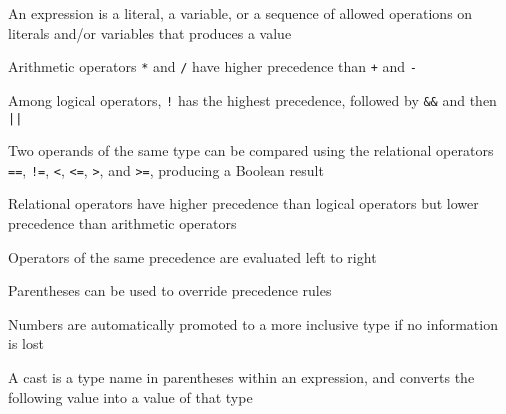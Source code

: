 \documentclass[8pt,a4paper,compress]{beamer}
\begin{document}
\begin{frame}[fragile]
An expression is a literal, a variable, or a sequence of allowed operations on literals and/or variables that produces a value

\bigskip

Arithmetic operators \lstinline{*} and \lstinline{/} have higher precedence than \lstinline{+} and \lstinline{-}

\bigskip

Among logical operators, \lstinline{!} has the highest precedence, followed by \lstinline{&&} and then \lstinline{||}

\bigskip

Two operands of the same type can be compared using the relational operators \lstinline{==}, \lstinline{!=}, \lstinline{<}, \lstinline{<=}, \lstinline{>}, and \lstinline{>=}, producing a Boolean result

\bigskip

Relational operators have higher precedence than logical operators but lower precedence than arithmetic operators

\bigskip

Operators of the same precedence are evaluated left to right

\bigskip

Parentheses can be used to override precedence rules

\bigskip

Numbers are automatically promoted to a more inclusive type if no information is lost

\bigskip

A cast is a type name in parentheses within an expression, and converts the following value into a value of that type
\end{frame}
\end{document}
